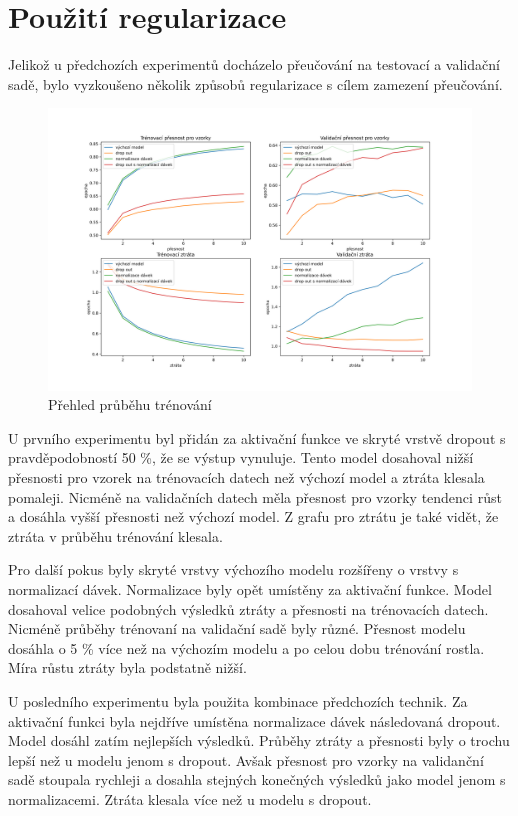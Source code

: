 \documentclass[FM,BP]{tulthesis}
\begin{document}
\section{Použití regularizace} %
Jelikož u předchozích experimentů docházelo přeučování na testovací a validační sadě, bylo vyzkoušeno několik způsobů regularizace s cílem zamezení přeučování.

\begin{figure}[!htbp]
\centerline{\includegraphics[scale=.5]{training_course-regularization.png}}
\caption{Přehled průběhu trénování}
\label{fig}
\end{figure}
\FloatBarrier

U prvního experimentu byl přidán za aktivační funkce ve skryté vrstvě dropout s pravděpodobností 50 \%, že se výstup vynuluje. Tento model dosahoval nižší přesnosti pro vzorek na trénovacích datech než výchozí model a ztráta klesala pomaleji. Nicméně na validačních datech měla přesnost pro vzorky tendenci růst a dosáhla vyšší přesnosti než výchozí model. Z grafu pro ztrátu je také vidět, že ztráta v průběhu trénování klesala. 

Pro další pokus byly skryté vrstvy výchozího modelu rozšířeny o vrstvy s normalizací dávek. Normalizace byly opět umístěny za aktivační funkce. Model dosahoval velice podobných výsledků ztráty a přesnosti na trénovacích datech. Nicméně průběhy trénovaní na validační sadě byly různé. Přesnost modelu dosáhla o 5 \% více než na výchozím modelu a po celou dobu trénování rostla. Míra růstu ztráty byla podstatně nižší. 

U posledního experimentu byla použita kombinace předchozích technik. Za aktivační funkci byla nejdříve umístěna normalizace dávek následovaná dropout. Model dosáhl zatím nejlepších výsledků. Průběhy ztráty a přesnosti byly o trochu lepší než u modelu jenom s dropout. Avšak přesnost pro vzorky na validanční sadě stoupala rychleji a dosahla stejných konečných výsledků jako model jenom s normalizacemi. Ztráta klesala více než u modelu s dropout.
\end{document}
